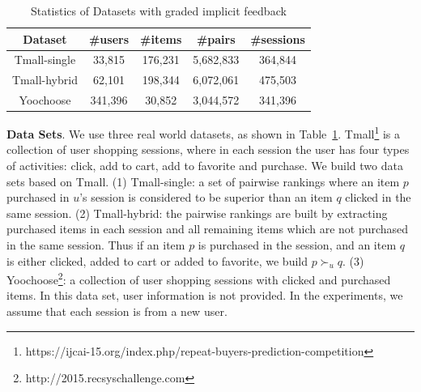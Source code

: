 \documentclass[letterpaper]{article} %
\begin{document}
\begin{table}[htp]
\tiny
\caption{Statistics of Datasets with graded implicit feedback}
\begin{center}
\begin{tabular}{|c|c|c|c|c|}
\hline
Dataset & \#users & \#items & \#pairs & \#sessions \\\hline
Tmall-single &33,815 &176,231 &5,682,833 &364,844 \\\hline
Tmall-hybrid &62,101 &198,344 &6,072,061 &475,503 \\\hline
Yoochoose &341,396 &30,852 &3,044,572 &341,396 \\\hline
\end{tabular}
\end{center}
\label{tab:idata}
\end{table}%

\textbf{Data Sets}. We use three real world datasets, as shown in Table~\ref{tab:idata}. Tmall\footnote{https://ijcai-15.org/index.php/repeat-buyers-prediction-competition} is a collection of user shopping sessions, where in each session the user has four types of activities: click, add to cart, add to favorite and purchase. We build two data sets based on Tmall. (1) Tmall-single: a set of pairwise rankings where an item $p$ purchased in $u$'s session is considered to be superior than an item $q$ clicked in the same session. (2) Tmall-hybrid: the pairwise rankings are built by extracting purchased items in each session and all remaining items which are not purchased in the same session. Thus if an item $p$ is purchased in the session, and an item $q$ is either clicked, added to cart or added to favorite, we build $p\succ_u q$. (3) Yoochoose\footnote{http://2015.recsyschallenge.com}: a collection of user shopping sessions with clicked and purchased items. In this data set, user information is not provided. In the experiments, we assume that each session is from a new user. 
\end{document}
